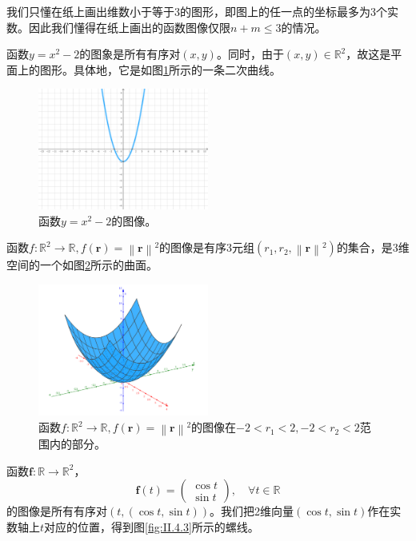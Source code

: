 \documentclass[main.tex]{subfiles}
\begin{document}
我们只懂在纸上画出维数小于等于3的图形，即图上的任一点的坐标最多为3个实数。因此我们懂得在纸上画出的函数图像仅限$n+m\leq3$的情况。
\begin{example}\label{exp:II.4.4}
    函数$y=x^2-2$的图象是所有有序对$\left(x,y\right)$。同时，由于$\left(x,y\right)\in\mathbb{R}^2$，故这是平面上的图形。具体地，它是如图\ref{fig:II.4.1}所示的一条二次曲线。
\end{example}
\begin{figure}[h]
    \centering
    \includegraphics[width=0.5\textwidth]{images/II.4.1.png}
    \caption{函数$y=x^2-2$的图像。}
    \label{fig:II.4.1}
\end{figure}
\begin{example}\label{exp:II.4.5}
    函数$f:\mathbb{R}^2\rightarrow\mathbb{R},f\left(\mathbf{r}\right)=\left\|\mathbf{r}\right\|^2$的图像是有序3元组$\left(r_1,r_2,\left\|\mathbf{r}\right\|^2\right)$的集合，是3维空间的一个如图\ref{fig:II.4.2}所示的曲面。
\end{example}
\begin{figure}[h]
    \centering
    \includegraphics[width=0.5\textwidth]{images/II.4.2.png}
    \caption{函数$f:\mathbb{R}^2\rightarrow\mathbb{R},f\left(\mathbf{r}\right)=\left\|\mathbf{r}\right\|^2$的图像在$-2<r_1<2,-2<r_2<2$范围内的部分。}
    \label{fig:II.4.2}
\end{figure}
\begin{example}\label{exp:II.4.6}
    函数$\mathbf{f}:\mathbb{R}\rightarrow\mathbb{R}^2$，
    \[
        \mathbf{f}\left(t\right)=\left(\begin{array}{c}\cos t\\\sin t\end{array}\right),\quad\forall t\in\mathbb{R}
    \]
    的图像是所有有序对$\left(t,\left(\cos t,\sin t\right)\right)$。我们把2维向量$\left(\cos t,\sin t\right)$作在实数轴上$t$对应的位置，得到图\ref{fig:II.4.3}所示的螺线。
\end{example}
\end{document}

